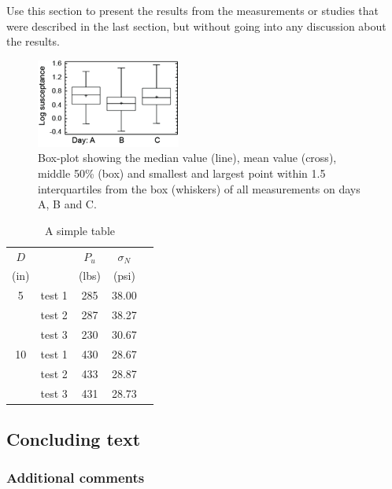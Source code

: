\documentclass{elbioimp}
\begin{document}
Use this section to present the results from the measurements or
studies that were described in the last section, but without going
into any discussion about the results.

\begin{figure}
  \centering
  \includegraphics[width=0.8\columnwidth]{test-ill}
  \caption{Box-plot showing the median value (line), mean value (cross),
    middle 50\% (box) and smallest and largest point within
    1.5\,interquartiles from the box (whiskers) of all measurements on
    days A, B and C.\label{fig:demo}}
\end{figure}

\begin{table}
  \centering
  \renewcommand{\arraystretch}{1.2}
  \begin{tabular}{clccc}
    $D$& &$P_u$& $\sigma_N$\\
    (in)& & (lbs)& (psi)\\  \hline
     5& test 1& 285& 38.00\\
      & test 2& 287& 38.27\\
      & test 3& 230& 30.67\\  \hline
    10& test 1& 430& 28.67\\
      & test 2& 433& 28.87\\
      & test 3& 431& 28.73\\  \hline
    \end{tabular}
  \caption{A simple table\label{tab:demo}}
\end{table}

\subsection{Concluding text}
\lipsum[1-9]

\subsubsection{Additional comments}
\lipsum[10-11]
\end{document}
